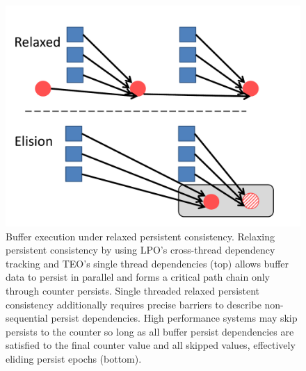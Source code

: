 \begin{figure}
\centering
\includegraphics[width=\textwidth]{PMC_patterns/buffer_relaxed_elision.pdf}
\caption{Buffer execution under relaxed persistent consistency.  Relaxing persistent consistency by using LPO's cross-thread dependency tracking and TEO's single thread dependencies (top) allows buffer data to persist in parallel and forms a critical path chain only through counter persists.  Single threaded relaxed persistent consistency additionally requires precise barriers to describe non-sequential persist dependencies.  High performance systems may skip persists to the counter so long as all buffer persist dependencies are satisfied to the final counter value and all skipped values, effectively eliding persist epochs (bottom).}
\label{fig:buffer_relaxed_elision}
\end{figure}
